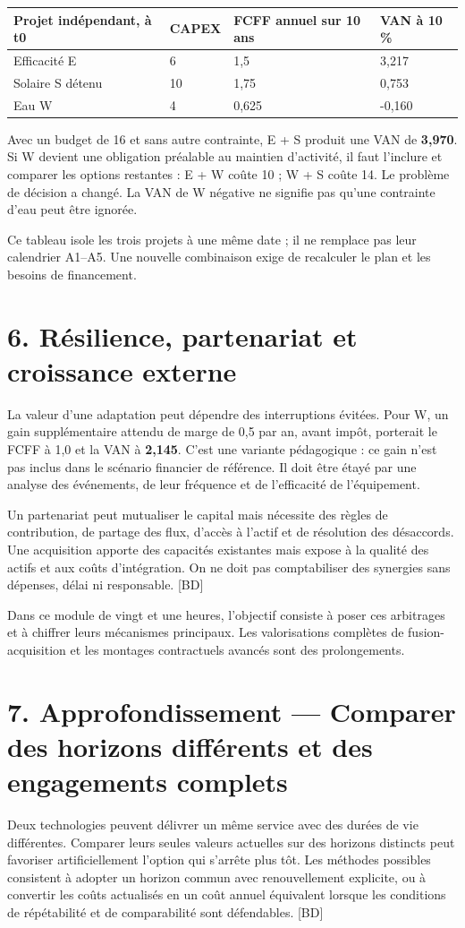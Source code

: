 \documentclass[12pt,a4paper]{article}
\begin{document}
\Needspace{180pt}
\begin{longtable}{p{3.67cm}p{3.67cm}p{3.67cm}p{3.67cm}}
\toprule
Projet indépendant, à t0 & CAPEX & FCFF annuel sur 10 ans & VAN à 10 \% \\
\midrule\endhead
Efficacité E & 6 & 1,5 & 3,217 \\
Solaire S détenu & 10 & 1,75 & 0,753 \\
Eau W & 4 & 0,625 & -0,160 \\
\bottomrule
\end{longtable}

Avec un budget de 16 et sans autre contrainte, E + S produit une VAN de \textbf{3,970}. Si W devient une obligation préalable au maintien d’activité, il faut l’inclure et comparer les options restantes : E + W coûte 10 ; W + S coûte 14. Le problème de décision a changé. La VAN de W négative ne signifie pas qu’une contrainte d’eau peut être ignorée.


Ce tableau isole les trois projets à une même date ; il ne remplace pas leur calendrier A1--A5. Une nouvelle combinaison exige de recalculer le plan et les besoins de financement.

\section*{6. Résilience, partenariat et croissance externe}
La valeur d’une adaptation peut dépendre des interruptions évitées. Pour W, un gain supplémentaire attendu de marge de 0,5 par an, avant impôt, porterait le FCFF à 1,0 et la VAN à \textbf{2,145}. C’est une variante pédagogique : ce gain n’est pas inclus dans le scénario financier de référence. Il doit être étayé par une analyse des événements, de leur fréquence et de l’efficacité de l’équipement.


Un partenariat peut mutualiser le capital mais nécessite des règles de contribution, de partage des flux, d’accès à l’actif et de résolution des désaccords. Une acquisition apporte des capacités existantes mais expose à la qualité des actifs et aux coûts d’intégration. On ne doit pas comptabiliser des synergies sans dépenses, délai ni responsable. [BD]


Dans ce module de vingt et une heures, l’objectif consiste à poser ces arbitrages et à chiffrer leurs mécanismes principaux. Les valorisations complètes de fusion-acquisition et les montages contractuels avancés sont des prolongements.

\section*{7. Approfondissement --- Comparer des horizons différents et des engagements complets}
Deux technologies peuvent délivrer un même service avec des durées de vie différentes. Comparer leurs seules valeurs actuelles sur des horizons distincts peut favoriser artificiellement l’option qui s’arrête plus tôt. Les méthodes possibles consistent à adopter un horizon commun avec renouvellement explicite, ou à convertir les coûts actualisés en un coût annuel équivalent lorsque les conditions de répétabilité et de comparabilité sont défendables. [BD]
\end{document}
